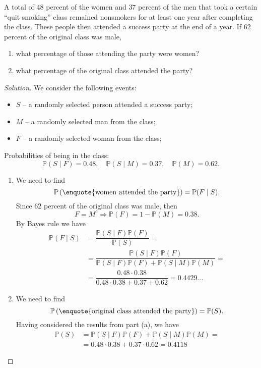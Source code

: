 \documentclass{article}[12pt]
\newenvironment{solution}
  {\renewcommand\qedsymbol{$\blacksquare$}\begin{proof}[Solution]}
  {\end{proof}}
\newenvironment{problem}[1]
  {\renewcommand\theinnercustomprblm{#1}\innercustomprblm}
  {\endinnercustomprblm}
\renewcommand{\P}{\mathbb{P}}
\begin{document}
\begin{problem}{3.19}\normalfont
A total of $48$ percent of the women and $37$ percent of the men that took a certain “quit smoking” class remained nonsmokers for at least one year after completing the class.
These people then attended a success party at the end of a year.
If 62 percent of the original class was male,
\begin{enumerate}[label=(\alph*)]
    \item what percentage of those attending the party were women?
    \item what percentage of the original class attended the party?
\end{enumerate}
\end{problem}
\begin{solution}
We consider the following events:
\begin{itemize}
    \item $S$ -- a randomly selected person attended a success party;
    \item $M$ -- a randomly selected man from the class;
    \item $F$ -- a randomly selected woman from the class;
\end{itemize}
Probabilities of being in the class:
\begin{equation*}
    \P(S\mid F) = 0.48,\quad\P(S\mid M) = 0.37,\quad\P(M) = 0.62.
\end{equation*}
\begin{enumerate}[label=(\alph*)]
    \item We need to find
    \begin{equation*}
        \P\left(\text{\enquote{women attended the party}}\right) = \P(F\mid S).
    \end{equation*}
    Since $62$ percent of the original class was male, then
    \begin{equation*}
        F = M^{c} \Longrightarrow\P(F) = 1 - \P(M) = 0.38.
    \end{equation*}
    By Bayes rule we have
    \begin{align*}
        \P(F\mid S) &= \dfrac{\P(S\mid F)\P(F)}{\P(S)} =
        \\
        & = \dfrac{\P(S\mid F)\P(F)}{\P(S\mid F)\P(F) + \P(S\mid M)\P(M)} =
        \\
        & = \dfrac{0.48\cdot 0.38}{0.48\cdot 0.38 + 0.37 + 0.62} = 0.4429\ldots
    \end{align*}

    \item We need to find
    \begin{equation*}
        \P\left(\text{\enquote{original class attended the party}}\right) = \P(S).
    \end{equation*}
    Having considered the results from part (a), we have
    \begin{align*}
        \P(S) &= \P(S\mid F)\P(F) + \P(S\mid M)\P(M) =
        \\
        & = 0.48\cdot 0.38 + 0.37\cdot 0.62 = 0.4118
    \end{align*}
\end{enumerate}
\end{solution}
\end{document}
